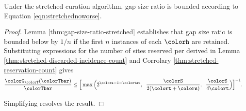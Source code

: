 \begin{theorem}
\label{thm:stretched-gap-size}
Under the stretched curation algorithm, gap size ratio is bounded according to Equation \ref{eqn:stretchednoworse}.
\end{theorem}
\begin{proof}

Lemma \ref{thm:gap-size-ratio-stretched} establishes that gap size ratio is bounded below by $1/n$ if the first $n$ instances of each \hv{} $\colorh$ are retained.
Substituting expressions for the number of sites reserved per \hv{} derived in Lemma \ref{thm:stretched-discarded-incidence-count} and Corrolary \ref{thm:stretched-reservation-count} gives
\begin{align*}
  \frac{\colorG_{\colorT}(\colorTbar)}{\colorTbar}
  &\leq
  \Big[
    \max\Big(
      2^{\colors - 1 - \colortau},\;\;
      \frac{\colorS}{2(\colort + \colors)},\;\;
      \frac{\colorS}{4\colort}
    \Big)
  \Big]^{-1}.
\end{align*}

Simplifying resolves the result.

\end{proof}
